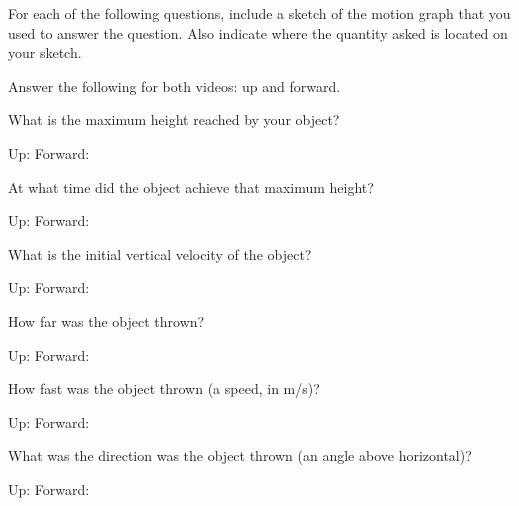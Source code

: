 \documentclass{handout}
\begin{document}
For each of the following questions, include a sketch of the motion graph that you used to answer the question. Also indicate where the quantity asked is located on your sketch.

Answer the following for both videos: up and forward.
\begin{questions}
    \question What is the maximum height reached by your object?
    
    Up: \hspace{\fill} Forward: \hspace{\fill}
    \answerspace{1.5in}

    \question At what time did the object achieve that maximum height?
    
    Up: \hspace{\fill} Forward: \hspace{\fill}
    \answerspace{1.5in}

    \question What is the initial vertical velocity of the object?
    
    Up: \hspace{\fill} Forward: \hspace{\fill}
    \answerspace{1.5in}

    \question How far was the object thrown?
    
    Up: \hspace{\fill} Forward: \hspace{\fill}
    \answerspace{1.5in}

    \question How fast was the object thrown (a speed, in m/s)?
    
    Up: \hspace{\fill} Forward: \hspace{\fill}
    \answerspace{1.5in}

    \question What was the direction was the object thrown (an angle above horizontal)?
    
    Up: \hspace{\fill} Forward: \hspace{\fill}
    \answerspace{1.5in}

\end{questions}
\end{document}
